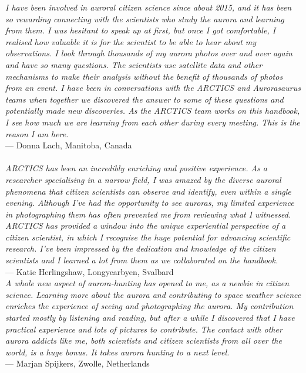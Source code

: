 \documentclass{article}
\begin{document}
\textit{I have been involved in auroral citizen science since about 2015, and it has been so rewarding connecting with the scientists who study the aurora and learning from them. I was hesitant to speak up at first, but once I got comfortable, I realised how valuable it is for the scientist to be able to hear about my observations. I look through thousands of my aurora photos over and over again and have so many questions. The scientists use satellite data and other mechanisms to make their analysis without the benefit of thousands of photos from an event. I have been in conversations with the ARCTICS and Aurorasaurus teams when together we discovered the answer to some of these questions and potentially made new discoveries. As the ARCTICS team works on this handbook, I see how much we are learning from each other during every meeting. This is the reason I am here.
}\\
--- Donna Lach, Manitoba, Canada\\
\\
\textit{ARCTICS has been an incredibly enriching and positive experience. As a researcher specialising in a narrow field, I was amazed by the diverse auroral phenomena that citizen scientists can observe and identify, even within a single evening. Although I’ve had the opportunity to see auroras, my limited experience in photographing them has often prevented me from reviewing what I witnessed. ARCTICS has provided a window into the unique experiential perspective of a citizen scientist, in which I recognise the huge potential for advancing scientific research. I’ve been impressed by the dedication and knowledge of the citizen scientists and I learned a lot from them as we collaborated on the handbook.}\\
--- Katie Herlingshaw, Longyearbyen, Svalbard\\

\textit{A whole new aspect of aurora-hunting has opened to me, as a newbie in citizen science. Learning more about the aurora and contributing to space weather science enriches the experience of seeing and photographing the aurora. My contribution started mostly by listening and reading, but after a while I discovered that I have practical experience and lots of pictures to contribute. The contact with other aurora addicts like me, both scientists and citizen scientists from all over the world, is a huge bonus. It takes aurora hunting to a next level.}\\
--- Marjan Spijkers, Zwolle, Netherlands
\\
\end{document}
